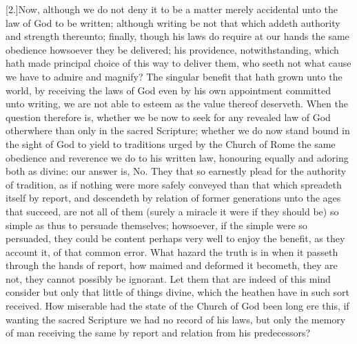 [2.]Now, although we do not deny it to be a matter merely accidental unto the law of God to be written; although writing be not that which addeth authority and strength thereunto; finally, though his laws do require at our hands the same obedience howsoever they be delivered; his providence, notwithstanding, which hath made principal choice of this way to deliver them, who seeth not what cause we have to admire and magnify? The singular benefit that hath grown unto the world, by receiving the laws of God even by his own appointment committed unto writing, we are not able to esteem as the value thereof deserveth. When the question therefore is, whether we be now to seek for any revealed law of God otherwhere than only in the sacred Scripture; whether we do now stand bound in the sight of God to yield to traditions urged by the Church of Rome the same obedience and reverence we do to his written law, honouring equally and adoring both as divine: our answer is, No. They that so earnestly plead for the authority of tradition, as if nothing were more safely conveyed than that which spreadeth itself by report, and descendeth by relation of former generations unto the ages that succeed, are not all of them (surely a miracle it were if they should be) so simple as thus to persuade themselves; howsoever, if the simple  were so persuaded, they could be content perhaps very well to enjoy the benefit, as they account it, of that common error. What hazard the truth is in when it passeth through the hands of report, how maimed and deformed it becometh, they are not, they cannot possibly be ignorant. Let them that are indeed of this mind consider but only that little of things divine, which the heathen have in such sort received. How miserable had the state of the Church of God been long ere this, if wanting the sacred Scripture we had no record of his laws, but only the memory of man receiving the same by report and relation from his predecessors?

